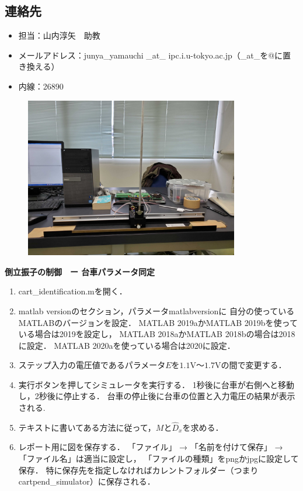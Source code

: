 \documentclass[a4,10pt]{article}
\begin{document}
\subsection*{連絡先}
\begin{itemize}
    \item 担当：山内淳矢　助教
    \item メールアドレス：junya\_yamauchi \_at\_ ipc.i.u-tokyo.ac.jp（\_at\_を@に置き換える）
    \item 内線：26890
\end{itemize}

\begin{figure}[h]
 \centering 
 \includegraphics[height=7cm]{figs/cart_pend.jpg}
\end{figure}

\begin{center}
 \LARGE \bfseries 倒立振子の制御　ー 台車パラメータ同定
\end{center}

\begin{enumerate}
    \item cart\_identification.mを開く．
    
    \item matlab versionのセクション，パラメータmatlabversionに
    自分の使っているMATLABのバージョンを設定．
    MATLAB 2019aかMATLAB 2019bを使っている場合は2019を設定し，
    MATLAB 2018aかMATLAB 2018bの場合は2018に設定．
    MATLAB 2020aを使っている場合は2020に設定．

    \item ステップ入力の電圧値であるパラメータ$E$を$1.1$V〜$1.7$Vの間で変更する．
    \item  実行ボタンを押してシミュレータを実行する．
    1秒後に台車が右側へと移動し，2秒後に停止する．
    台車の停止後に台車の位置と入力電圧の結果が表示される.
    \item テキストに書いてある方法に従って，$M$と$\hat{D}_x$を求める．
    \item レポート用に図を保存する．
    「ファイル」 → 「名前を付けて保存」 → 「ファイル名」は適当に設定し， 「ファイルの種類」をpngかjpgに設定して保存．
    特に保存先を指定しなければカレントフォルダー（つまりcartpend\_simulator）に保存される．
\end{enumerate}
\end{document}
